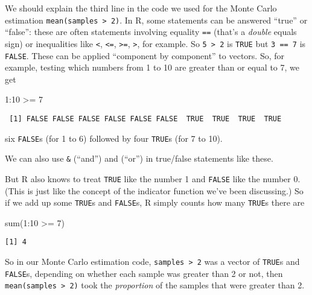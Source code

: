 \documentclass[
  letterpaper,
  DIV=11,
  numbers=noendperiod]{scrreprt}
\newenvironment{Shaded}{\begin{snugshade}}{\end{snugshade}}
\newcommand{\DecValTok}[1]{\textcolor[rgb]{0.68,0.00,0.00}{#1}}
\newcommand{\FunctionTok}[1]{\textcolor[rgb]{0.28,0.35,0.67}{#1}}
\newcommand{\NormalTok}[1]{\textcolor[rgb]{0.00,0.23,0.31}{#1}}
\newcommand{\SpecialCharTok}[1]{\textcolor[rgb]{0.37,0.37,0.37}{#1}}
\theoremstyle{plain}
\theoremstyle{definition}
\theoremstyle{definition}
\theoremstyle{remark}
\begin{document}
We should explain the third line in the code we used for the Monte Carlo
estimation \texttt{mean(samples\ \textgreater{}\ 2)}. In R, some
statements can be answered ``true'' or ``false'': these are often
statements involving equality \texttt{==} (that's a \emph{double} equals
sign) or inequalities like \texttt{\textless{}}, \texttt{\textless{}=},
\texttt{\textgreater{}=}, \texttt{\textgreater{}}, for example. So
\texttt{5\ \textgreater{}\ 2} is \texttt{TRUE} but \texttt{3\ ==\ 7} is
\texttt{FALSE}. These can be applied ``component by component'' to
vectors. So, for example, testing which numbers from 1 to 10 are greater
than or equal to 7, we get

\begin{Shaded}
\begin{Highlighting}[]
\DecValTok{1}\SpecialCharTok{:}\DecValTok{10} \SpecialCharTok{\textgreater{}=} \DecValTok{7}
\end{Highlighting}
\end{Shaded}

\begin{verbatim}
 [1] FALSE FALSE FALSE FALSE FALSE FALSE  TRUE  TRUE  TRUE  TRUE
\end{verbatim}

six \texttt{FALSE}s (for 1 to 6) followed by four \texttt{TRUE}s (for 7
to 10).

We can also use \texttt{\&} (``and'') and \texttt{\textbar{}} (``or'')
in true/false statements like these.

But R also knows to treat \texttt{TRUE} like the number 1 and
\texttt{FALSE} like the number 0. (This is just like the concept of the
indicator function we've been discussing.) So if we add up some
\texttt{TRUE}s and \texttt{FALSE}s, R simply counts how many
\texttt{TRUE}s there are

\begin{Shaded}
\begin{Highlighting}[]
\FunctionTok{sum}\NormalTok{(}\DecValTok{1}\SpecialCharTok{:}\DecValTok{10} \SpecialCharTok{\textgreater{}=} \DecValTok{7}\NormalTok{)}
\end{Highlighting}
\end{Shaded}

\begin{verbatim}
[1] 4
\end{verbatim}

So in our Monte Carlo estimation code,
\texttt{samples\ \textgreater{}\ 2} was a vector of \texttt{TRUE}s and
\texttt{FALSE}s, depending on whether each sample was greater than 2 or
not, then \texttt{mean(samples\ \textgreater{}\ 2)} took the
\emph{proportion} of the samples that were greater than 2.
\end{document}
